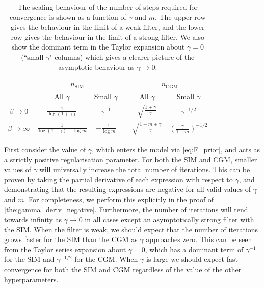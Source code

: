 \begin{table}[t]
    \centering
    \def\arraystretch{1.5}
    \begin{tabular}{@{}cccccc}
    \toprule
    & \multicolumn{2}{c}{$n_\text{SIM}$} & \phantom{abc} & \multicolumn{2}{c}{$n_\text{CGM}$} \\
    \cmidrule{2-3} \cmidrule{5-6}
                               & All $\gamma$   & Small $\gamma$   &&  All $\gamma$   & Small $\gamma$ \\ \midrule \rule{0pt}{1cm}
    $\beta \rightarrow 0$      & $ \displaystyle \frac{1}{\log(1 + \gamma)}$   & $\displaystyle \gamma^{-1}$    &&    $\displaystyle \sqrt{\frac{1 + \gamma}{\gamma}}$ & $\displaystyle \gamma^{-1/2}$    \\ \rule{0pt}{6ex}
    $\beta \rightarrow \infty$ & $\displaystyle \frac{1}{\log(1 + \gamma) - \log m}$ & $\displaystyle -\frac{1}{\log m}$    &&  $\displaystyle \sqrt{\frac{1 - m + \gamma}{\gamma}}$ & $\displaystyle \left(\frac{\gamma}{1 - m} \right)^{-1/2}$ \\[0.5cm] \bottomrule 
    \end{tabular}
    \caption[The scaling behaviour of the number of steps required for convergence as a function of $\gamma$ and $m$.]{The scaling behaviour of the number of steps required for convergence is shown as a function of $\gamma$ and $m$. The upper row gives the behaviour in the limit of a weak filter, and the lower row gives the behaviour in the limit of a strong filter. We also show the dominant term in the Taylor expansion about $\gamma=0$ (``small $\gamma$" columns) which gives a clearer picture of the asymptotic behaviour as $\gamma \rightarrow 0$. }
    \label{tab:conv_SIM_CGM} 
\end{table}

First consider the value of $\gamma$, which enters the model via \cref{eq:F_prior}, and acts as a strictly positive regularisation parameter. For both the SIM and CGM, smaller values of $\gamma$ will universally increase the total number of iterations. This can be proven by taking the partial derivative of each expression with respect to $\gamma$, and demonstrating that the resulting expressions are negative for all valid values of $\gamma$ and $m$. For completeness, we perform this explicitly in the proof of \cref{the:gamma_deriv_negative}. Furthermore, the number of iterations will tend towards infinity as $\gamma \rightarrow 0$ in all cases except an asymptotically strong filter with the SIM. When the filter is weak, we should expect that the number of iterations grows faster for the SIM than the CGM as $\gamma$ approaches zero. This can be seen from the Taylor series expansion about $\gamma = 0$, which has a dominant term of $\gamma^{-1}$ for the SIM and $\gamma^{-1/2}$ for the CGM. When $\gamma$ is large we should expect fast convergence for both the SIM and CGM regardless of the value of the other hyperparameters. 

